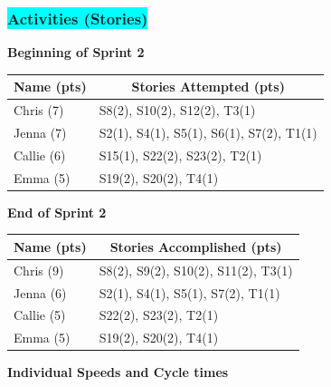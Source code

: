 \subsubsection{\colorbox{cyan}{Activities (Stories)}}

\textbf{Beginning of Sprint 2}

\begin{table}[!hbt]
\begin{tabular}{|l|l|}
\hline
\multicolumn{1}{|c|}{\textbf{Name (pts)}} & \multicolumn{1}{c|}{\textbf{Stories Attempted (pts)}} \\ \hline
Chris (7)  & S8(2), S10(2), S12(2), T3(1)       \\ \hline
Jenna (7)  & S2(1), S4(1), S5(1), S6(1), S7(2), T1(1) \\ \hline
Callie (6) & S15(1), S22(2), S23(2), T2(1)              \\ \hline
Emma (5)   & S19(2), S20(2), T4(1)               \\ \hline
\end{tabular}
\end{table}
\label{start sprint 2}

\noindent \textbf{End of Sprint 2}

\begin{table}[!hbt]
\begin{tabular}{|l|l|}
\hline
\multicolumn{1}{|c|}{\textbf{Name (pts)}} & \multicolumn{1}{c|}{\textbf{Stories Accomplished (pts)}} \\ \hline
Chris (9)  & S8(2), S9(2), S10(2), S11(2), T3(1) \\ \hline
Jenna (6)  & S2(1), S4(1), S5(1), S7(2), T1(1)   \\ \hline
Callie (5) & S22(2), S23(2), T2(1)             \\ \hline
Emma (5)   & S19(2), S20(2), T4(1)         \\ \hline
\end{tabular}
\end{table}
\label{end sprint 2}

\pagebreak

\noindent \textbf{Individual Speeds and Cycle times}

